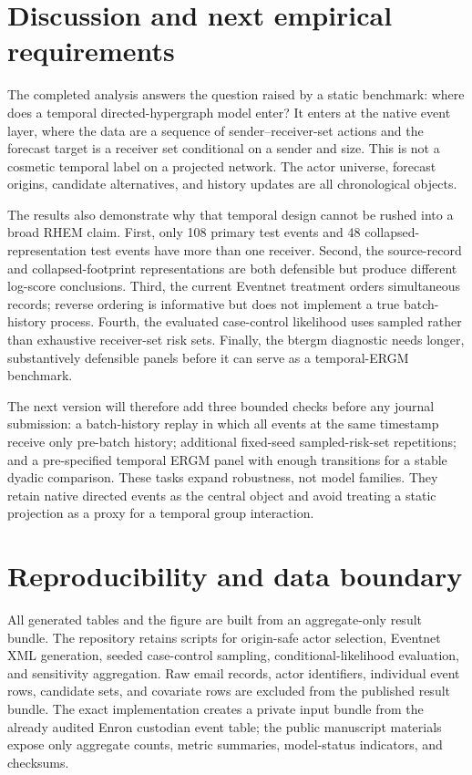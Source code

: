 \documentclass[11pt]{article}
\begin{document}
\section{Discussion and next empirical requirements}\label{sec:discussion}

The completed analysis answers the question raised by a static benchmark: where does a temporal directed-hypergraph model enter? It enters at the native event layer, where the data are a sequence of sender--receiver-set actions and the forecast target is a receiver set conditional on a sender and size. This is not a cosmetic temporal label on a projected network. The actor universe, forecast origins, candidate alternatives, and history updates are all chronological objects.

The results also demonstrate why that temporal design cannot be rushed into a broad RHEM claim. First, only 108 primary test events and 48 collapsed-representation test events have more than one receiver. Second, the source-record and collapsed-footprint representations are both defensible but produce different log-score conclusions. Third, the current Eventnet treatment orders simultaneous records; reverse ordering is informative but does not implement a true batch-history process. Fourth, the evaluated case-control likelihood uses sampled rather than exhaustive receiver-set risk sets. Finally, the btergm diagnostic needs longer, substantively defensible panels before it can serve as a temporal-ERGM benchmark.

The next version will therefore add three bounded checks before any journal submission: a batch-history replay in which all events at the same timestamp receive only pre-batch history; additional fixed-seed sampled-risk-set repetitions; and a pre-specified temporal ERGM panel with enough transitions for a stable dyadic comparison. These tasks expand robustness, not model families. They retain native directed events as the central object and avoid treating a static projection as a proxy for a temporal group interaction.

\section{Reproducibility and data boundary}\label{sec:reproducibility}

All generated tables and the figure are built from an aggregate-only result bundle. The repository retains scripts for origin-safe actor selection, Eventnet XML generation, seeded case-control sampling, conditional-likelihood evaluation, and sensitivity aggregation. Raw email records, actor identifiers, individual event rows, candidate sets, and covariate rows are excluded from the published result bundle. The exact implementation creates a private input bundle from the already audited Enron custodian event table; the public manuscript materials expose only aggregate counts, metric summaries, model-status indicators, and checksums.
\end{document}

